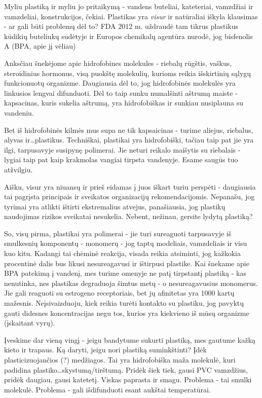 \documentclass[]{book}
\begin{document}
Myliu plastiką ir myliu jo pritaikymą - vandens buteliai, kateteriai, vamzdžiai ir vamzdeliai, konstrukcijos, čekiai. Plastikas yra \emph{visur} ir natūraliai iškyla klausimas - ar gali būti problemų dėl to? FDA 2012 m. uždraudė tam tikrus plastikus kūdikių buteliukų sudėtyje ir Europos chemikalų agentūra nurodė, jog bisfenolis A (BPA, apie jį vėliau)

Anksčiau šnekėjome apie hidrofobines molekules - riebalų rūgštis, vaškus, steroidinius hormonus, visą puokštę molekulių, kurioms reikia išskirtinių sąlygų funkcionuotų organizme. Daugiausia dėl to, jog hidrofobinės molekulės yra linkusios lengvai difunduoti. Dėl to taip sunku numalšinti aštrumą maiste - kapsacinas, kuris sukelia aštrumą, yra hidrofobiškas ir sunkiau nusiplauna su vandeniu.

Bet iš hidrofobinės kilmės mus supa ne tik kapsaicinas - turime aliejus, riebalus, alyvas ir\ldots{}plastikus. Techniškai, plastikai yra hidrofobiški, tačiau taip pat jie yra ilgi, tarpusavyje susipynę polimerai. Jie neturi reikalo maišytis su riebalais - lygiai taip pat kaip krakmolas vangiai tirpsta vandenyje. Esame saugūs tuo atžvilgiu.

Aišku, visur yra niuansų ir prieš eidamas į juos iškart turiu perspėti - daugiausia tai pagrįsta principais ir sveikatos organizacijų rekomendacijomis. Nepanašu, jog tyrimai yra atlikti ištirti ekstremalius atvejus, panašiausia, jog plastikų naudojimas rizikos sveikatai nesukelia. Nebent, nežinau, gersite lydytą plastiką?

So, visų pirma, plastikai yra polimerai - jie turi sureaguoti tarpusavyje iš smulkesnių komponentų - monomerų - jog taptų modeliais, vamzdeliais ir visu kuo kitu. Kadangi tai chėminė reakcija, visada reikia atsiminti, jog kažkokia procentinė dalis bus likusi nesureagavusi ir ištirpusi plastike. Kai šnekame apie BPA patekimą į vandenį, mes turime omenyje ne patį tirpstantį plastiką - kas nenutinka, nes plastikas degraduoja šimtus metų - o nesureagavusius monomerus. Jie gali reaguoti su estrogeno receptoriais, bet jų afinitetas yra 1000 kartų mažesnis. Neįsivaizduoju, kiek reikia turėti kontakto su plastiku, jog pavyktų gauti didesnes koncentracijas negu tos, kurios yra kiekvieno iš mūsų organizme (įskaitant vyrų).

Įveskime dar vieną vingį - jeigu bandytume sukurti plastiką, mes gautume kažką kieto ir trapaus. Ką daryti, jeigu nori plastiką suminkštinti? Įdėk plasticizuojančios (?) medžiagos. Tai yra hidrofobiška maža molekulė, kuri padidina plastiko\ldots{}skystumą/tirštumą. Pridėk šiek tiek, gausi PVC vamzdžius, pridėk daugiau, gausi katetetį. Viskas paprasta ir smagu. Problema - tai smulki molekulė. Problema - gali išdifunduoti esant aukštai temperatūrai.
\end{document}
